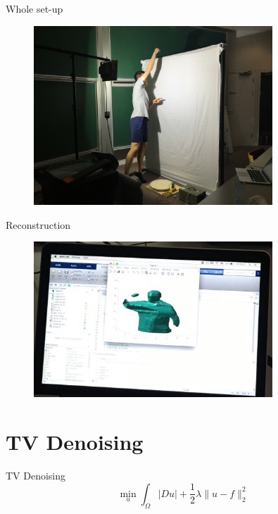 \documentclass{beamer}
\begin{document}
\begin{frame}{Whole set-up}
    \begin{figure}[H]
      \centering
        \includegraphics[width=0.8\textwidth]{IMG_5444.jpg}
      \label{fig:f2}
    \end{figure}
\end{frame}

\begin{frame}{Reconstruction}
    \begin{figure}[H]
      \centering
        \includegraphics[width=0.8\textwidth]{martin_recon.jpg}
      \label{fig:f2}
    \end{figure}
\end{frame}

\section{TV Denoising}

\begin{frame}{TV Denoising}
    \begin{equation}
        \min_{u}\int_{\Omega}|Du|+\frac12\lambda \|u-f\|_2^2 \nonumber
    \end{equation}
\end{frame}
\end{document}
